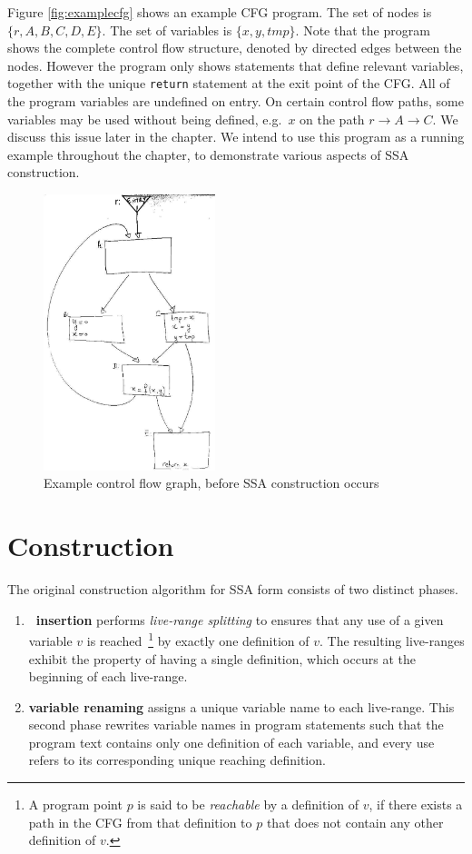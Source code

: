 Figure \ref{fig:examplecfg} shows an example CFG 
program. The set of nodes is $\{ r, A, B, C, D, E\}$.
The set of variables is $\{ x, y, \mathit{tmp} \}$.
Note that the program shows the complete control flow structure,
denoted by directed edges between the nodes.
However the program only shows 
statements that define relevant variables, together with the
unique \texttt{return} statement at the exit point of the CFG.
All of the program variables are undefined on entry. On certain
control
flow paths, some variables may be used without being defined, 
e.g.\ $x$ on the path $r \rightarrow A \rightarrow C$. 
We discuss this issue later in the chapter.
We intend to use this program as a running example
throughout the chapter,
to demonstrate various aspects of SSA construction.


\begin{figure}
\includegraphics[width=5cm]{initial.jpg}
\caption{\label{fig:classical_construction_algorithm:examplecfg}Example control flow graph, before
  SSA construction occurs}
\end{figure}

\section{Construction}
\label{sec:classical_construction}

The original construction algorithm for SSA form 
consists of two distinct phases.
\begin{enumerate}
\item \textbf{\phiop\ insertion} performs \textit{live-range splitting} to ensures that any use of a given variable $v$ is reached~\footnote{A program point $p$ is said to be \emph{reachable} by a definition of $v$, if there exists a path in the CFG from that definition to $p$ that does not contain any other definition of $v$.}  by exactly one definition of $v$. 
The resulting live-ranges exhibit the property of having a single definition, which occurs at the beginning of each live-range.
\item \textbf{variable renaming} assigns a unique variable name to each live-range. This second phase rewrites variable names in program statements such that the program text contains only one definition of each variable, and every use refers to its corresponding unique reaching definition.
\end{enumerate}

